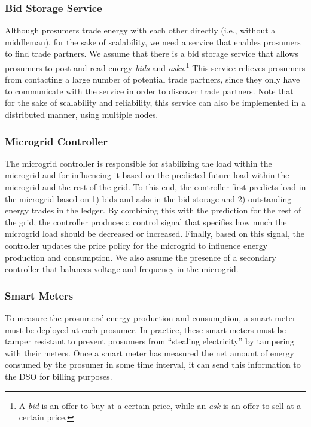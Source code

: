 \subsubsection{Bid Storage Service}
Although prosumers trade energy with each other directly (i.e., without a middleman), for the sake of scalability, we need a service that enables prosumers to find trade partners.
We assume that there is a bid storage service that allows prosumers to post and read energy \emph{bids} and \emph{asks}.\footnote{A \emph{bid} is an offer to buy at a certain price, while an \emph{ask} is an offer to sell at a certain price.}  
This service relieves prosumers from contacting a large number of potential trade partners, since they only have to communicate with the service in order to discover trade partners.
Note that
for the sake of scalability and reliability, this service can also be implemented in a distributed manner, using multiple nodes.

\subsubsection{Microgrid Controller}
The microgrid controller is responsible for stabilizing the load within the microgrid and for influencing it based on the predicted future load within the microgrid and the rest of the grid. 
To this end, the controller first predicts load in the microgrid based on 1) bids and asks in the bid storage and 2) outstanding energy trades in the ledger.
By combining this  with the prediction for the rest of the grid, the controller produces a control signal that specifies how much the microgrid load should be decreased or increased.
Finally, based on this signal, the controller updates the price policy for the microgrid to influence energy production and consumption.
We also assume the presence of a secondary controller that balances voltage and frequency in the microgrid.

\subsubsection{Smart Meters}
To measure the prosumers' energy production and consumption, a smart meter must be deployed at each prosumer.
In practice, these smart meters must be tamper resistant to prevent prosumers from ``stealing electricity'' by tampering with their meters.
Once a smart meter has measured the net amount of energy consumed by the prosumer in some time interval, it can send this information to the DSO for billing purposes.

